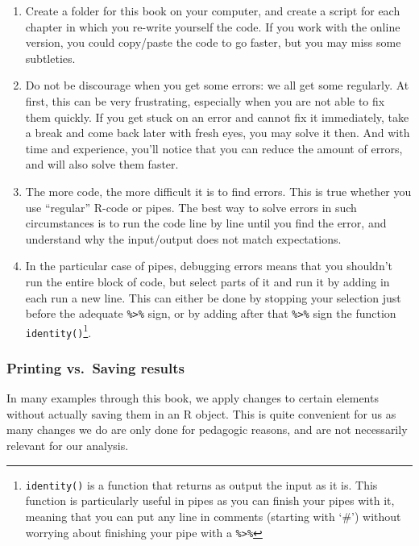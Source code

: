 \documentclass[
]{book}
\providecommand{\tightlist}{%
  \setlength{\itemsep}{0pt}\setlength{\parskip}{0pt}}
\begin{document}
\begin{enumerate}
\def\labelenumi{\arabic{enumi}.}
\tightlist
\item
  Create a folder for this book on your computer, and create a script for each chapter in which you re-write yourself the code. If you work with the online version, you could copy/paste the code to go faster, but you may miss some subtleties.
\item
  Do not be discourage when you get some errors: we all get some regularly. At first, this can be very frustrating, especially when you are not able to fix them quickly. If you get stuck on an error and cannot fix it immediately, take a break and come back later with fresh eyes, you may solve it then. And with time and experience, you'll notice that you can reduce the amount of errors, and will also solve them faster.
\item
  The more code, the more difficult it is to find errors. This is true whether you use ``regular'' R-code or pipes. The best way to solve errors in such circumstances is to run the code line by line until you find the error, and understand why the input/output does not match expectations.
\item
  In the particular case of pipes, debugging errors means that you shouldn't run the entire block of code, but select parts of it and run it by adding in each run a new line. This can either be done by stopping your selection just before the adequate \texttt{\%\textgreater{}\%} sign, or by adding after that \texttt{\%\textgreater{}\%} sign the function \texttt{identity()}\footnote{\texttt{identity()} is a function that returns as output the input as it is. This function is particularly useful in pipes as you can finish your pipes with it, meaning that you can put any line in comments (starting with `\#') without worrying about finishing your pipe with a \texttt{\%\textgreater{}\%}}.
\end{enumerate}

\hypertarget{printing-vs.-saving-results}{%
\subsubsection{Printing vs.~Saving results}\label{printing-vs.-saving-results}}

In many examples through this book, we apply changes to certain elements without actually saving them in an R object. This is quite convenient for us as many changes we do are only done for pedagogic reasons, and are not necessarily relevant for our analysis.
\end{document}
